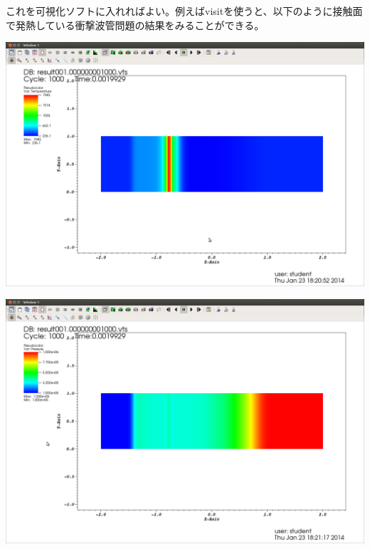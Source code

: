 \documentclass{jsarticle}
\begin{document}
これを可視化ソフトに入れればよい。例えばvisitを使うと、以下のように接触面で発熱している衝撃波管問題の結果をみることができる。
\begin{center}
\includegraphics[width=.7\textwidth,bb=0 0 1522 1056]{tutorial_img/270.png}
\end{center}
\begin{center}
\includegraphics[width=.7\textwidth,bb=0 0 1522 1056]{tutorial_img/280.png}
\end{center}
\end{document}
